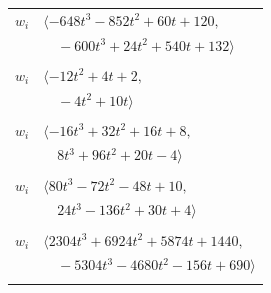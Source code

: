 \documentclass[11pt]{article}
\begin{document}
\begin{longtable}{@{}ll@{}}
$w_i$ & $\langle -648t^{3}-852t^{2}+60t+120,$\\
 & $\quad -600t^{3}+24t^{2}+540t+132\rangle$\\
\addlinespace[2pt]
\multicolumn{2}{@{}p{0.97\textwidth}@{}}{$i=56$, $D_i=2$, $\rho_{ij}$: $2{:}1, \allowbreak 20{:}1, \allowbreak 26{:}1, \allowbreak 27{:}1, \allowbreak 31{:}2$}\\
$w_i$ & $\langle -12t^{2}+4t+2,$\\
 & $\quad -4t^{2}+10t\rangle$\\
\addlinespace[2pt]
\multicolumn{2}{@{}p{0.97\textwidth}@{}}{$i=57$, $D_i=4$, $\rho_{ij}$: $28{:}2, \allowbreak 33{:}1, \allowbreak 38{:}1, \allowbreak 43{:}2, \allowbreak 45{:}1, \allowbreak 51{:}2$}\\
$w_i$ & $\langle -16t^{3}+32t^{2}+16t+8,$\\
 & $\quad 8t^{3}+96t^{2}+20t-4\rangle$\\
\addlinespace[2pt]
\multicolumn{2}{@{}p{0.97\textwidth}@{}}{$i=58$, $D_i=4$, $\rho_{ij}$: $9{:}2, \allowbreak 10{:}1, \allowbreak 21{:}2, \allowbreak 28{:}1, \allowbreak 40{:}2, \allowbreak 54{:}2$}\\
$w_i$ & $\langle 80t^{3}-72t^{2}-48t+10,$\\
 & $\quad 24t^{3}-136t^{2}+30t+4\rangle$\\
\addlinespace[2pt]
\multicolumn{2}{@{}p{0.97\textwidth}@{}}{$i=59$, $D_i=4$, $\rho_{ij}$: $0{:}1, \allowbreak 7{:}2, \allowbreak 26{:}2, \allowbreak 30{:}2, \allowbreak 32{:}2, \allowbreak 41{:}1, \allowbreak 44{:}1, \allowbreak 47{:}2, \allowbreak 52{:}1, \allowbreak 53{:}2$}\\
$w_i$ & $\langle 2304t^{3}+6924t^{2}+5874t+1440,$\\
 & $\quad -5304t^{3}-4680t^{2}-156t+690\rangle$\\
\addlinespace[2pt]
\end{longtable}
\endgroup
\end{document}
